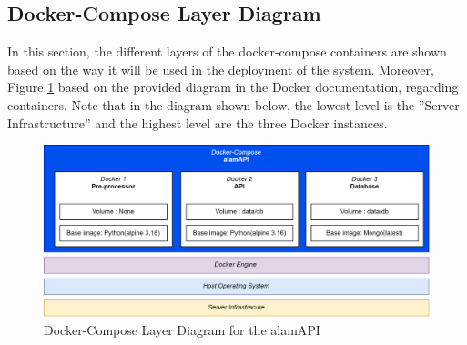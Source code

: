 \subsection{Docker-Compose Layer Diagram}
\label{subsec:docker_compose_diagram}
In this section, the different layers of the docker-compose 
containers are shown based on the way it will be used in the 
deployment of the system. Moreover, Figure \ref{fig:docker_compose_layout} 
based on the provided diagram in the Docker documentation, regarding containers. 
Note that in the diagram shown below, the lowest level is the 
”Server Infrastructure” and the highest level are the three Docker instances.
\begin{figure}[ht]
    \centering
    \includegraphics[width=1\textwidth]{./assets/Docker-Compose Layout.png}
    \caption{Docker-Compose Layer Diagram for the alamAPI}
    \label{fig:docker_compose_layout}
\end{figure}